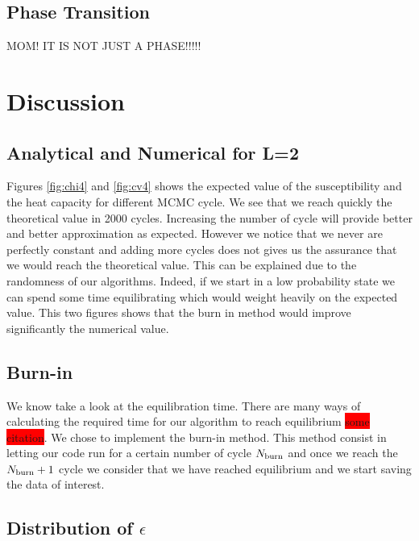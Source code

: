 \documentclass[english,notitlepage,reprint,nofootinbib]{revtex4-2}  %
\begin{document}
	\subsection{Phase Transition}\label{subsec:num phase transition}

	MOM! IT IS NOT JUST A PHASE!!!!!
	
	\section{Discussion}\label{sec:discussion}
	\subsection{Analytical and Numerical for L=2}\label{subsec:dis 2x2}
	
	Figures \ref{fig:chi4} and \ref{fig:cv4} shows the expected value of the susceptibility
	and the heat capacity for different MCMC cycle. We see that we reach quickly the theoretical
	value in 2000 cycles. Increasing the number of cycle will provide better and better 
	approximation as expected. However we notice that we never are perfectly constant and adding
	more cycles does not gives us the assurance that we would reach the theoretical value. This 
	can be explained due to the randomness of our algorithms. Indeed, if we start in a low probability state we can spend some time equilibrating which would weight heavily on the 
	expected value. This two figures shows that the burn in method would improve significantly 
	the numerical value.
	
	
	\subsection{Burn-in}\label{subsec:dis burnin}
	
	We know take a look at the equilibration time. There are many ways of calculating the required
	time for our algorithm to reach equilibrium \colorbox{red}{some citation}. We chose 
	to implement the burn-in method. This method consist in letting our code run for a certain number
	of cycle $N_{\rm burn}$ and once we reach the $N_{\rm burn} + 1$ cycle we consider that we have reached equilibrium and we start saving the data of interest.    
	
	
	\subsection{Distribution of $\epsilon$}\label{subsec:dis epsilon}
	
\end{document}
